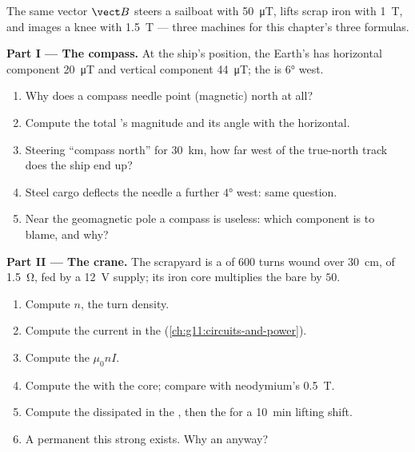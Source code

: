 \begin{problem}
\label{pb:g11:magnetic-fields:1}
The same vector $\vect B$ steers a sailboat with \qty{50}{\micro T},
lifts scrap iron with \qty{1}{T}, and images a knee with \qty{1.5}{T}
--- three machines for this chapter's three formulas.

\medskip
\noindent\textbf{Part I --- The compass.}
At the ship's position, the Earth's  has horizontal component
\qty{20}{\micro T} and vertical component \qty{44}{\micro T};
the  is $\ang{6}$ west.
\begin{enumerate}
  \item Why does a compass needle point (magnetic) north at all?
  \item Compute the total 's magnitude and its angle with the horizontal.
  \item Steering ``compass north'' for \qty{30}{km}, how far west of
        the true-north track does the ship end up?
  \item Steel cargo deflects the needle a further $\ang{4}$ west: same question.
  \item Near the geomagnetic pole a compass is useless: which component
        is to blame, and why?
\end{enumerate}

\medskip
\noindent\textbf{Part II --- The crane.}
The scrapyard  is a  of $600$ turns wound over
\qty{30}{cm}, of  \qty{1.5}{\ohm}, fed by a \qty{12}{V}
supply; its iron core multiplies the bare  by $50$.
\begin{enumerate}[resume]
  \item Compute $n$, the turn density.
  \item Compute the current in the  (\cref{ch:g11:circuits-and-power}).
  \item Compute the   $\mu_0 n I$.
  \item Compute the  with the core; compare with neodymium's \qty{0.5}{T}.
  \item Compute the  dissipated in the , then the  for
        a \qty{10}{\minute} lifting shift.
  \item A permanent  this strong exists. Why an  anyway?
\end{enumerate}


\end{problem}
